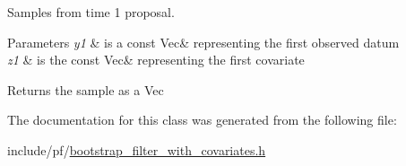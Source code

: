 Samples from time 1 proposal. 


\begin{DoxyParams}{Parameters}
{\em y1} & is a const Vec\& representing the first observed datum \\
\hline
{\em z1} & is the const Vec\& representing the first covariate \\
\hline
\end{DoxyParams}
\begin{DoxyReturn}{Returns}
the sample as a Vec 
\end{DoxyReturn}


The documentation for this class was generated from the following file\+:\begin{DoxyCompactItemize}
\item 
include/pf/\hyperlink{bootstrap__filter__with__covariates_8h}{bootstrap\+\_\+filter\+\_\+with\+\_\+covariates.\+h}\end{DoxyCompactItemize}
